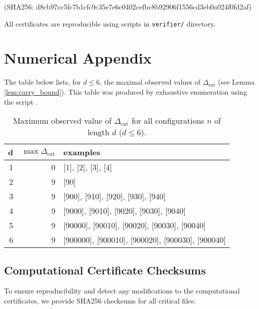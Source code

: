 \documentclass[12pt,a4paper]{article}
\begin{document}
\begin{center}
	\texttt{} (SHA256: d8cb97cc5fc7b1cfc9c35e7e6c0402cefbc8b92906f1556cd3eb0a024f0fd2af)
\end{center}


All certificates are reproducible using scripts in \texttt{verifier/} directory.

\section*{Numerical Appendix}
The table below lists, for $d\le 6$, the maximal observed values of
$\Delta_{\mathrm{ext}}$ (see Lemma \ref{lem:carry_bound}). This table was
produced by exhaustive enumeration using the script \texttt{}.

\begin{table}[ht]
\centering
\caption{Maximum observed value of $\Delta_{\mathrm{ext}}$ for all configurations $n$ of length $d$ ($d\le 6$).}
\begin{tabular}{rrl}\toprule
d & $\max\Delta_{\mathrm{ext}}$ & examples \\ \midrule
1 & 0 & [1], [2], [3], [4] \\ 
2 & 9 & [90] \\ 
3 & 9 & [900], [910], [920], [930], [940] \\ 
4 & 9 & [9000], [9010], [9020], [9030], [9040] \\ 
5 & 9 & [90000], [90010], [90020], [90030], [90040] \\ 
6 & 9 & [900000], [900010], [900020], [900030], [900040] \\ 
\bottomrule
\end{tabular}
\end{table}

\subsection*{Computational Certificate Checksums}

To ensure reproducibility and detect any modifications to the 
computational certificates, we provide SHA256 checksums for all 
critical files:
\end{document}
